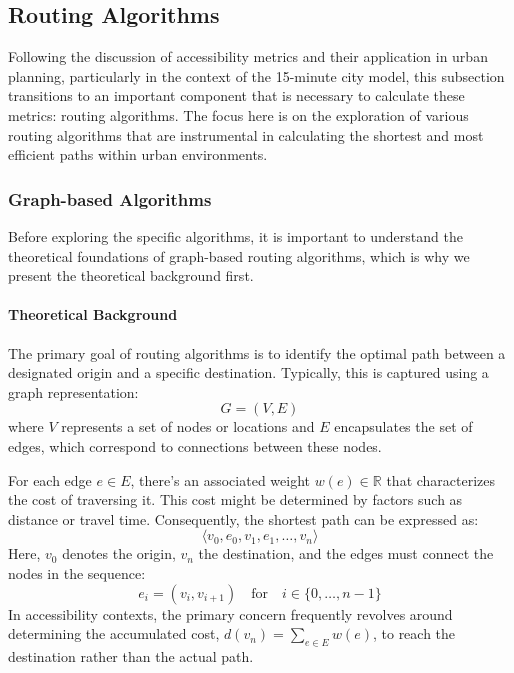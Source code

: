 \subsection{Routing Algorithms}
\label{subsec:routing_algorithms}

Following the discussion of accessibility metrics and their application in urban planning, particularly in the context of the 15-minute city model, this subsection transitions to an important component that is necessary to calculate these metrics: routing algorithms.
The focus here is on the exploration of various routing algorithms that are instrumental in calculating the shortest and most efficient paths within urban environments. 

\subsubsection{Graph-based Algorithms}

Before exploring the specific algorithms, it is important to understand the theoretical foundations of graph-based routing algorithms, which is why we present the theoretical background first.

\paragraph{Theoretical Background}

The primary goal of routing algorithms is to identify the optimal path between a designated origin and a specific destination.
Typically, this is captured using a graph representation:
\[ G = (V, E) \]
where $V$ represents a set of nodes or locations and $E$ encapsulates the set of edges, which correspond to connections between these nodes.

For each edge \( e \in E \), there's an associated weight \( w(e) \in \mathbb{R} \) that characterizes the cost of traversing it.
This cost might be determined by factors such as distance or travel time.
Consequently, the shortest path can be expressed as:
\[ \langle v_0, e_0, v_1, e_1, \dots, v_n \rangle \]
Here, \( v_0 \) denotes the origin, \( v_n \) the destination, and the edges must connect the nodes in the sequence:
\[ e_i = (v_i, v_{i+1}) \quad \text{for} \quad i \in \{0, \dots, n-1\} \]
In accessibility contexts, the primary concern frequently revolves around determining the accumulated cost, \( d(v_n) = \sum_{e \in E} w(e) \), to reach the destination rather than the actual path.

